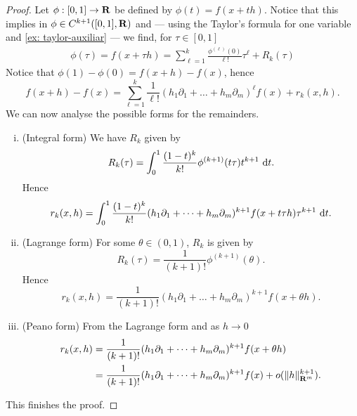 \begin{proof}
    Let \(\phi: [0, 1] \to \mathbf{R}\) be defined by \(\phi(t) = f(x + th)\). Notice that
    this implies in \(\phi \in C^{k+1}([0, 1], \mathbf{R})\) and --- using the Taylor's formula
    for one variable and \cref{ex: taylor-auxiliar} --- we find, for \(\tau \in [0, 1]\)
    \begin{align*}
        \phi(\tau)
        = f(x + \tau h)
        = \sum_{\ell=1}^k \frac{\phi^{(\ell)}(0)}{\ell!} \tau^\ell + R_k(\tau)
    \end{align*}
    Notice that \(\phi(1) - \phi(0) = f(x + h) - f(x)\), hence
    \[
        f(x + h) - f(x) =
        \sum_{\ell=1}^k \frac 1 {\ell!}
        (h_1 \partial_1 + \dots + h_m \partial_m)^\ell f(x) + r_k(x, h).
    \]
    We can now analyse the possible forms for the remainders.
    \begin{enumerate}[(i)]
        \item (Integral form) We have \(R_k\) given by
              \[
                  R_k(\tau) = \int_0^1 \frac{(1 - t)^k}{k!} \phi^{(k+1)}(t \tau) t^{k+1}\
                  \mathrm{d} t.
              \]
              Hence
              \[
                  r_k(x, h) = \int_0^1 \frac{(1 - t)^k}{k!}
                  (h_1 \partial_1 + \dots + h_m \partial_m)^{k+1} f(x + t \tau h) \tau^{k
                      + 1}\ \mathrm{d} t.
              \]
        \item (Lagrange form) For some \(\theta \in (0, 1)\), \(R_k\) is given by
              \[
                  R_k(\tau) = \frac 1 {(k + 1)!} \phi^{(k+1)}(\theta).
              \]
              Hence
              \[
                  r_k(x, h) = \frac 1 {(k + 1)!} (h_1 \partial_1 + \dots + h_m
                  \partial_m)^{k+1} f(x + \theta h).
              \]
        \item (Peano form) From the Lagrange form and as \(h \to 0\)
              \begin{align*}
                  r_k(x, h)
                   & = \frac 1 {(k + 1)!} (h_1 \partial_1 + \dots + h_m \partial_m)^{k+1}
                  f(x + \theta h)                                                         \\
                   & = \frac 1 {(k + 1)!} (h_1 \partial_1 + \dots + h_m
                  \partial_m)^{k+1} f(x) + o(\lVert h\rVert_{\mathbf{R}^m}^{k+1}).
              \end{align*}
    \end{enumerate}
    This finishes the proof.
\end{proof}

